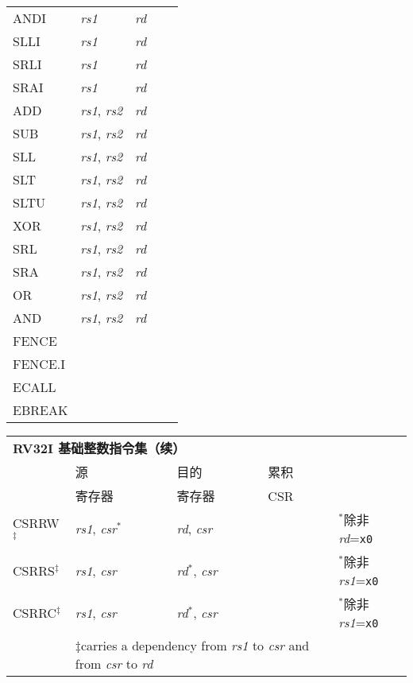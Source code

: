 \begin{tabular}{p{3cm}|p{3cm}|p{2cm}|p{4cm}|p{4cm}}
   \cline{2-4}
   ANDI & {\em rs1} & {\em rd} &   & \\
   \cline{2-4}
   SLLI & {\em rs1} & {\em rd} &   & \\
   \cline{2-4}
   SRLI & {\em rs1} & {\em rd} &   & \\
   \cline{2-4}
   SRAI & {\em rs1} & {\em rd} &   & \\
   \cline{2-4}
   ADD & {\em rs1}, {\em rs2} & {\em rd} &   & \\
   \cline{2-4}
   SUB & {\em rs1}, {\em rs2} & {\em rd} &   & \\
   \cline{2-4}
   SLL & {\em rs1}, {\em rs2} & {\em rd} &   & \\
   \cline{2-4}
   SLT & {\em rs1}, {\em rs2} & {\em rd} &   & \\
   \cline{2-4}
   SLTU & {\em rs1}, {\em rs2} & {\em rd} &   & \\
   \cline{2-4}
   XOR & {\em rs1}, {\em rs2} & {\em rd} &   & \\
   \cline{2-4}
   SRL & {\em rs1}, {\em rs2} & {\em rd} &   & \\
   \cline{2-4}
   SRA & {\em rs1}, {\em rs2} & {\em rd} &   & \\
   \cline{2-4}
   OR & {\em rs1}, {\em rs2} & {\em rd} &   & \\
   \cline{2-4}
   AND & {\em rs1}, {\em rs2} & {\em rd} &   & \\
   \cline{2-4}
   FENCE &  &  &   & \\
   \cline{2-4}
   FENCE.I &  &  &   & \\
   \cline{2-4}
   ECALL &  &  &   & \\
   \cline{2-4}
   EBREAK &  &  &   & \\
   \cline{2-4}
\end{tabular}

\begin{tabular}{p{3cm}|p{3cm}|p{2cm}|p{4cm}|p{4cm}}
  \multicolumn{4}{l}{\bf RV32I 基础整数指令集（续）} \\
  \cline{2-4}
    & 源    & 目的 & 累积 \\
    & 寄存器 & 寄存器   & CSR \\
  \cline{2-4}
   CSRRW$^\ddagger$ & {\em rs1}, {\em csr}$^*$ & {\em rd}, {\em csr} & & $^*$除非{\em rd}={\tt x0}  \\
   \cline{2-4}
   CSRRS$^\ddagger$ & {\em rs1}, {\em csr} & {\em rd}$^*$, {\em csr} & & $^*$除非{\em rs1}={\tt x0}  \\
   \cline{2-4}
   CSRRC$^\ddagger$ & {\em rs1}, {\em csr} & {\em rd}$^*$, {\em csr} & & $^*$除非{\em rs1}={\tt x0}  \\
   \cline{2-4}
   \multicolumn{1}{c}{} & \multicolumn{3}{l}{$\ddagger$carries a dependency from {\em rs1} to {\em csr} and from {\em csr} to {\em rd}}
\end{tabular}

